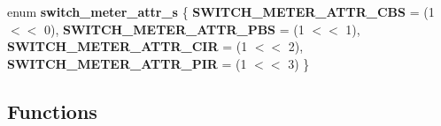 \begin{DoxyCompactItemize}
\item 
\hypertarget{group__Meters_ga417b98cdb28dce78d99d1f795afc6d99}{enum {\bfseries switch\+\_\+meter\+\_\+attr\+\_\+s} \{ {\bfseries S\+W\+I\+T\+C\+H\+\_\+\+M\+E\+T\+E\+R\+\_\+\+A\+T\+T\+R\+\_\+\+C\+B\+S} = (1 $<$$<$ 0), 
{\bfseries S\+W\+I\+T\+C\+H\+\_\+\+M\+E\+T\+E\+R\+\_\+\+A\+T\+T\+R\+\_\+\+P\+B\+S} = (1 $<$$<$ 1), 
{\bfseries S\+W\+I\+T\+C\+H\+\_\+\+M\+E\+T\+E\+R\+\_\+\+A\+T\+T\+R\+\_\+\+C\+I\+R} = (1 $<$$<$ 2), 
{\bfseries S\+W\+I\+T\+C\+H\+\_\+\+M\+E\+T\+E\+R\+\_\+\+A\+T\+T\+R\+\_\+\+P\+I\+R} = (1 $<$$<$ 3)
 \}}\label{group__Meters_ga417b98cdb28dce78d99d1f795afc6d99}

\end{DoxyCompactItemize}
\subsection*{Functions}
